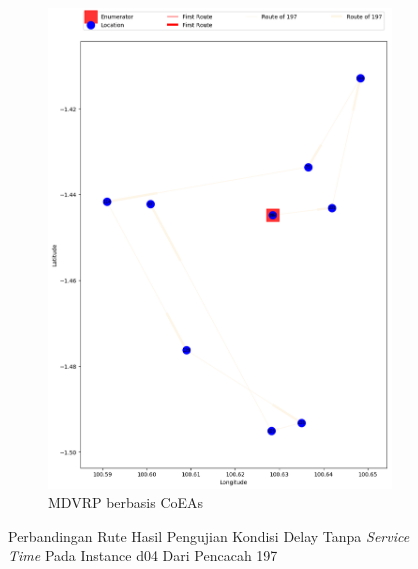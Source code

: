 \begin{figure}[H]
	\centering
	\begin{subfigure}[t]{\textwidth}
		\centering
		\includegraphics[width=\textwidth]{Resources/Images/delayed_5/real_m15_n100_delayed_5_197_coes}
		\caption{MDVRP berbasis CoEAs}
		\label{fig:real_m15_n100_delayed_5_197_coes}
	\end{subfigure}
	\caption{Perbandingan Rute Hasil Pengujian Kondisi Delay Tanpa \textit{Service Time} Pada Instance d04 Dari Pencacah 197}
	\label{fig:real_m15_n100_delayed_5_197}
\end{figure}


